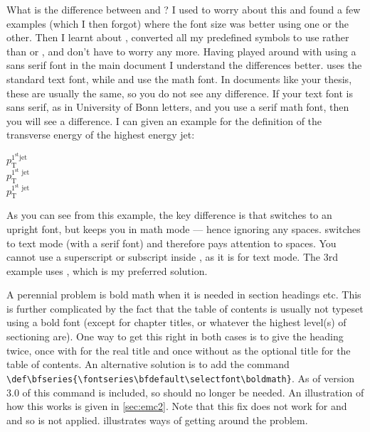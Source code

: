 What is the difference between  and
? I used to worry about this and found a
few examples (which I then forgot) where the font size was better
using one or the other. Then I learnt about ,
converted all my predefined symbols to use  rather than
 or , and don't have to worry any
more.
Having played around with using a sans serif font in the main document I understand the differences better.
 uses the standard text font,
while  and  use the math font.
In documents like your thesis, these are usually the same,
so you do not see any difference.
If your text font is sans serif, as in University of Bonn letters,
and you use a serif math font, then you will see a difference.
I can given an example for the definition
of the transverse energy of the highest energy jet:
\begin{tcblisting}{}
\(p_{\mathrm{T}}^{\mathrm{1^{\text{st}} jet}}\)\\
\(p_{\textrm{T}}^{\textrm{1}^{\text{st}}\textrm{ jet}}\)\\
\(p_{\text{T}}^{1^{\text{st}}\text{ jet}}\)
\end{tcblisting}
As you can see
from this example, the key difference is that  switches
to an upright font, but keeps you in math mode --- hence ignoring any
spaces.
 switches to text mode (with a serif font) and
therefore pays attention to spaces.
You cannot use a superscript or subscript inside ,
as it is for text mode.
The 3rd example uses , which is my preferred solution.

A perennial problem is bold math when it is needed in
section headings etc. This is further complicated by the fact that the
table of contents is usually not typeset using a bold font (except for
chapter titles, or whatever the highest level(s) of sectioning are). %
One way to get this right in both cases is to give the
heading twice, once with  for the real title and once
without as the optional title for the table of contents.
An alternative solution is to add the command\\
\verb|\def\bfseries{\fontseries\bfdefault\selectfont\boldmath}|.
As of version 3.0 of  this command is included,
so  should no longer be needed.
An illustration of how this works is given in \cref{sec:emc2}.
Note that this fix does not work for \LuaLaTeX and \XeLaTeX and so is not applied.
 illustrates ways of getting around the problem.

